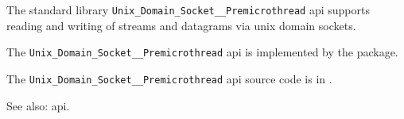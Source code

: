 
The standard library {\tt Unix\_Domain\_Socket\_\_Premicrothread} api supports reading and writing of streams and datagrams via unix domain sockets.

The {\tt Unix\_Domain\_Socket\_\_Premicrothread} api is implemented by the  package.

The {\tt Unix\_Domain\_Socket\_\_Premicrothread} api source code is in .

See also:  api.

